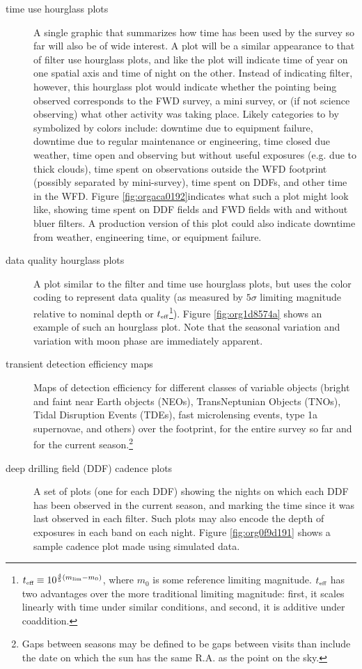 \begin{description}
\item[{time use hourglass plots}] A single graphic that summarizes how time has been used by the survey so far will also be of wide interest. A plot will be a similar appearance to that of filter use hourglass plots, and like the plot will indicate time of year on one spatial axis and time of night on the other. Instead of indicating filter, however, this hourglass plot would indicate whether the pointing being observed corresponds to the FWD survey, a mini survey, or (if not science observing) what other activity was taking place. Likely categories to by symbolized by colors include: downtime due to equipment failure, downtime due to regular maintenance or engineering, time closed due weather, time open and observing but without useful exposures (e.g. due to thick clouds), time spent on observations outside the WFD footprint (possibly separated by mini-survey), time spent on DDFs, and other time in the WFD. Figure \ref{fig:orgaca0192}indicates what such a plot might look like, showing time spent on DDF fields and FWD fields with and without bluer filters. A production version of this plot could also indicate downtime from weather, engineering time, or equipment failure.
\item[{data quality hourglass plots}] A plot similar to the filter and time use hourglass plots, but uses the color coding to represent data quality (as measured by \(5\sigma\) limiting magnitude relative to nominal depth or \(t_{\mbox{\tiny eff}}\)\footnote{\(t_{\mbox{\tiny eff}} \equiv 10^{\frac{4}{5}(m_{\mbox{\tiny lim}} - m_{0})}\), where \(m_{0}\) is some reference limiting magnitude. \(t_{\mbox{\tiny eff}}\) has two advantages over the more traditional limiting magnitude: first, it scales linearly with time under similar conditions, and second, it is additive under coaddition.}). Figure \ref{fig:org1d8574a} shows an example of such an hourglass plot. Note that the seasonal variation and variation with moon phase are immediately apparent.
\item[{transient detection efficiency maps}] Maps of detection efficiency for different classes of variable objects (bright and faint near Earth objects (NEOs), TransNeptunian Objects (TNOs), Tidal Disruption Events (TDEs), fast microlensing events, type 1a supernovae, and others) over the footprint, for the entire survey so far and for the current season.\footnote{Gaps between seasons may be defined to be gaps between visits than include the date on which the sun has the same R.A. as the point on the sky.}
\item[{deep drilling field (DDF) cadence plots}] A set of plots (one for each DDF) showing the nights on which each DDF has been observed in the current season, and marking the time since it was last observed in each filter. Such plots may also encode the depth of exposures in each band on each night. Figure \ref{fig:org0f9d191} shows a sample cadence plot made using simulated data.

\end{description}
